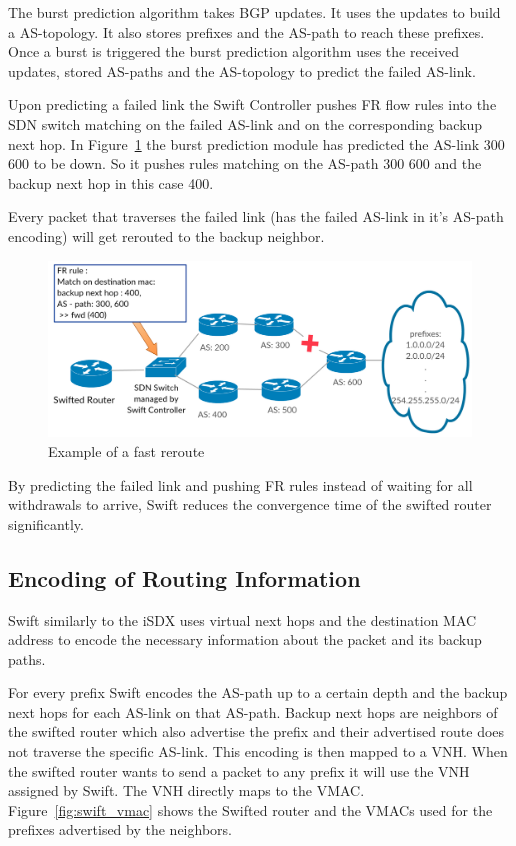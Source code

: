 The burst prediction algorithm takes BGP updates. It uses the updates to build a AS-topology. It also stores prefixes and the AS-path to reach these prefixes. Once a burst is triggered the burst prediction algorithm uses the received updates, stored AS-paths and the AS-topology to predict the failed AS-link.

Upon predicting a failed link the Swift Controller pushes FR flow rules into the SDN switch matching on the failed AS-link and on the corresponding backup next hop. In Figure~\ref{fig:swift_FR} the burst prediction module has predicted the AS-link 300 600 to be down. So it pushes rules matching on the AS-path 300 600 and the backup next hop in this case 400.

Every packet that traverses the failed link (has the failed AS-link in it's AS-path encoding) will get rerouted to the backup neighbor.
\begin{figure}[h]
\center
\includegraphics[scale = 0.36]{Figures/bckgrnd_swift_fr.pdf}
\caption{Example of a fast reroute}
\label{fig:swift_FR}
\end{figure}

By predicting the failed link and pushing FR rules instead of waiting for all withdrawals to arrive, Swift reduces the convergence time of the swifted router significantly.

\newpage

\subsection{\label{chapter2:Swift:encoding_of_routing_information}Encoding of Routing Information}
Swift similarly to the iSDX uses virtual next hops and the destination MAC address to encode the necessary information about the packet and its backup paths.

For every prefix Swift encodes the AS-path up to a certain depth and the backup next hops for each AS-link on that AS-path. Backup next hops are neighbors of the swifted router which also advertise the prefix and their advertised route does not traverse the specific AS-link. This encoding is then mapped to a VNH. When the swifted router wants to send a packet to any prefix it will use the VNH assigned by Swift. The VNH directly maps to the VMAC. \\
Figure~\ref{fig:swift_vmac} shows the Swifted router and the VMACs used for the prefixes advertised by the neighbors.

